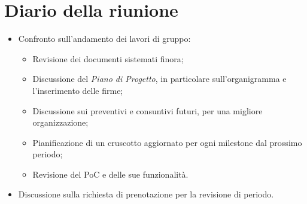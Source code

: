 \section{Diario della riunione}
\begin{itemize}
  \item Confronto sull'andamento dei lavori di gruppo:
  \begin{itemize}
    \item Revisione dei documenti sistemati finora;
    \item Discussione del \textit{Piano di Progetto}, in particolare sull'organigramma e l'inserimento delle firme;
    \item Discussione sui preventivi e consuntivi futuri, per una migliore organizzazione;
    \item Pianificazione di un cruscotto aggiornato per ogni milestone dal prossimo periodo;
    \item Revisione del PoC e delle sue funzionalità.
  \end{itemize}
  \item Discussione sulla richiesta di prenotazione per la revisione di periodo.
\end{itemize}
